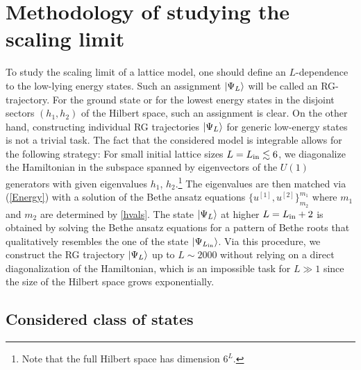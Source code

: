 \documentclass[12pt]{article}
\numberwithin{equation}{section}
\begin{document}
\section{Methodology of studying the scaling limit}\label{sec:methodology}

To study the scaling limit of a lattice model, one should define an $L$-dependence to the low-lying energy states. Such an assignment $\ket{\Psi_L}$ will be called an RG-trajectory. For the ground state or for the lowest energy states in the disjoint sectors $(h_1,h_2)$ of the Hilbert space, such an assignment is clear. On the other hand, constructing individual RG trajectories $\ket{\Psi_L}$ for generic low-energy states is not a trivial task. The fact that the considered model is integrable allows for the following strategy: For small initial lattice sizes $L=L_{\rm{in}} \lesssim 6$, we diagonalize the Hamiltonian in the subspace spanned by eigenvectors of the $U(1)$ generators with given eigenvalues  $h_1$, $h_2$.\footnote{Note that the full Hilbert space has dimension $6^{L}$.} The eigenvalues are then matched via (\ref{Energy}) with a solution of the Bethe ansatz equations $\{u^{[1]},u^{[2]}\}^{m_1}_{m_2}$ where $m_1$ and $m_2$ are determined by \eqref{hvals}. The state $\ket{\Psi_{L}}$ at higher $L=L_{\rm{in}}+2$ is obtained by solving the Bethe ansatz equations for a pattern of Bethe roots that qualitatively resembles the one of the state $\ket{\Psi_{L_{\rm{in}}}}$. Via this procedure, we construct the RG trajectory $\ket{\Psi_{L}}$ up to $L \sim 2000$ without relying on a direct diagonalization of the Hamiltonian, which is an impossible task for $L\gg 1$ since the size of the Hilbert space grows exponentially. 

\subsection{Considered class of states}
\end{document}
